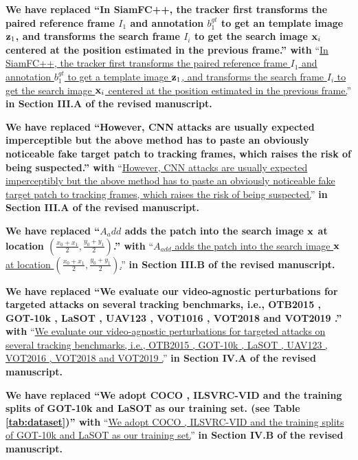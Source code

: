 \documentclass[12pt]{article}
\begin{document}
\textbf{We have replaced ``In SiamFC++, the tracker first transforms the paired reference frame $I_1$ and annotation $b_1^{gt}$ to get an template image $\textbf z_1$, and transforms the search frame $I_i$ to get the search image $\textbf x_i$ centered at the position estimated in the previous frame.'' with}
``\uline{In SiamFC++, the tracker first transforms the paired reference frame $I_1$ and annotation $b_1^{gt}$ to get a template image $\textbf z_1$, and transforms the search frame $I_i$ to get the search image $\textbf x_i$ centered at the position estimated in the previous frame.}''
\textbf{in Section III.A of the revised manuscript.}

\textbf{We have replaced ``However, CNN attacks are usually expected imperceptible but the above method has to paste an obviously noticeable fake target patch to tracking frames, which raises the risk of being suspected.'' with}
``\uline{However, CNN attacks are usually expected imperceptibly but the above method has to paste an obviously noticeable fake target patch to tracking frames, which raises the risk of being suspected.}''
\textbf{in Section III.A of the revised manuscript.}

\textbf{We have  replaced ``$A_add$ adds the patch into the search image $\textbf x$ at location $(\frac{x_0+x_1}{2},\frac{y_0+y_1}{2})$.'' with}
``\uline{$A_{add}$ adds the patch into the search image $\textbf x$ at location $(\frac{x_0+x_1}{2},\frac{y_0+y_1}{2})$.}''
\textbf{in Section III.B of the revised manuscript.}

\textbf{We have replaced ``We evaluate our video-agnostic perturbations for targeted attacks on several tracking benchmarks, i.e., OTB2015 \cite{OTB}, GOT-10k \cite{GOT-10k}, LaSOT \cite{LaSOT}, UAV123 \cite{UAV123}, VOT1016 \cite{VOT2016}, VOT2018 \cite{VOT2018} and VOT2019 \cite{VOT2019}.'' with}
``\uline{We evaluate our video-agnostic perturbations for targeted attacks on several tracking benchmarks, i.e., OTB2015 \cite{OTB}, GOT-10k \cite{GOT-10k}, LaSOT \cite{LaSOT}, UAV123 \cite{UAV123}, VOT2016 \cite{VOT2016}, VOT2018 \cite{VOT2018} and VOT2019 \cite{VOT2019}.}''
\textbf{in Section IV.A of the revised manuscript.}

\textbf{We have replaced ``We adopt COCO \cite{COCO}, ILSVRC-VID \cite{VID} and the training splits of GOT-10k \cite{GOT-10k} and LaSOT \cite{LaSOT} as our training set. (see Table \ref{tab:dataset})'' with}
``\uline{We adopt COCO \cite{COCO}, ILSVRC-VID \cite{VID} and the training splits of GOT-10k \cite{GOT-10k} and LaSOT \cite{LaSOT} as our training set.}''
\textbf{in Section IV.B of the revised manuscript.}
\end{document}
